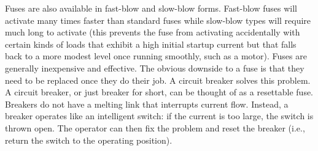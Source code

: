 \documentclass{report}
\begin{document}
\begin{itemize}
            Fuses are also available in fast-blow and slow-blow forms. Fast-blow fuses will activate many times faster than standard fuses while slow-blow types will require much long to activate (this prevents the fuse from activating accidentally with certain kinds of loads that exhibit a high initial startup current but that falls back to a more modest level once running smoothly, such as a motor).
            \bigbreak \noindent 
            Fuses are generally inexpensive and effective. The obvious downside to a fuse is that they need to be replaced once they do their job. A circuit breaker solves this problem. 
            \bigbreak \noindent 
            A circuit breaker, or just breaker for short, can be thought of as a resettable fuse. Breakers do not have a melting link that interrupts current flow. Instead, a breaker operates like an intelligent switch: if the current is too large, the switch is thrown open. The operator can then fix the problem and reset the breaker (i.e., return the switch to the operating position).
            \bigbreak \noindent 





    \end{itemize}
\end{document}
